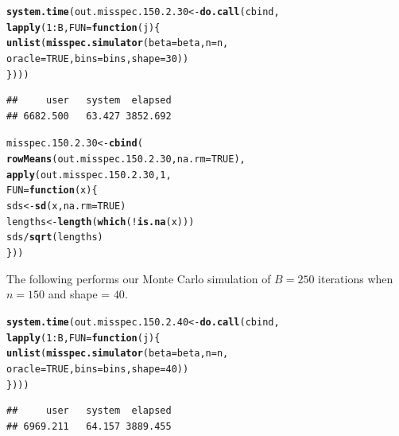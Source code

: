 \documentclass[11pt]{article}\usepackage[]{graphicx}\usepackage[]{color}
\makeatletter
\newcommand{\hlnum}[1]{\textcolor[rgb]{0.686,0.059,0.569}{#1}}%
\newcommand{\hlopt}[1]{\textcolor[rgb]{0,0,0}{#1}}%
\newcommand{\hlstd}[1]{\textcolor[rgb]{0.345,0.345,0.345}{#1}}%
\newcommand{\hlkwa}[1]{\textcolor[rgb]{0.161,0.373,0.58}{\textbf{#1}}}%
\newcommand{\hlkwb}[1]{\textcolor[rgb]{0.69,0.353,0.396}{#1}}%
\newcommand{\hlkwc}[1]{\textcolor[rgb]{0.333,0.667,0.333}{#1}}%
\newcommand{\hlkwd}[1]{\textcolor[rgb]{0.737,0.353,0.396}{\textbf{#1}}}%
\newenvironment{kframe}{%
 \def\at@end@of@kframe{}%
 \ifinner\ifhmode%
  \def\at@end@of@kframe{\end{minipage}}%
  \begin{minipage}{\columnwidth}%
 \fi\fi%
 \def\FrameCommand##1{\hskip\@totalleftmargin \hskip-\fboxsep
 \colorbox{shadecolor}{##1}\hskip-\fboxsep
     \hskip-\linewidth \hskip-\@totalleftmargin \hskip\columnwidth}%
 \MakeFramed {\advance\hsize-\width
   \@totalleftmargin\z@ \linewidth\hsize
   \@setminipage}}%
 {\par\unskip\endMakeFramed%
 \at@end@of@kframe}
\newenvironment{knitrout}{}{} %
\makeatother
\begin{document}
\begin{knitrout}
\color{fgcolor}\begin{kframe}
\begin{alltt}
\hlkwd{system.time}\hlstd{(out.misspec.150.2.30} \hlkwb{<-} \hlkwd{do.call}\hlstd{(cbind,}
  \hlkwd{lapply}\hlstd{(}\hlnum{1}\hlopt{:}\hlstd{B,} \hlkwc{FUN} \hlstd{=} \hlkwa{function}\hlstd{(}\hlkwc{j}\hlstd{)\{}
    \hlkwd{unlist}\hlstd{(}\hlkwd{misspec.simulator}\hlstd{(}\hlkwc{beta} \hlstd{= beta,} \hlkwc{n} \hlstd{= n,}
      \hlkwc{oracle} \hlstd{=} \hlnum{TRUE}\hlstd{,} \hlkwc{bins} \hlstd{= bins,} \hlkwc{shape} \hlstd{=} \hlnum{30}\hlstd{))}
\hlstd{\})))}
\end{alltt}
\begin{verbatim}
##     user   system  elapsed 
## 6682.500   63.427 3852.692
\end{verbatim}
\end{kframe}
\end{knitrout}

\begin{knitrout}
\color{fgcolor}\begin{kframe}
\begin{alltt}
\hlstd{misspec.150.2.30} \hlkwb{<-} \hlkwd{cbind}\hlstd{(}
  \hlkwd{rowMeans}\hlstd{(out.misspec.150.2.30,} \hlkwc{na.rm} \hlstd{=} \hlnum{TRUE}\hlstd{),}
  \hlkwd{apply}\hlstd{(out.misspec.150.2.30,} \hlnum{1}\hlstd{,}
  \hlkwc{FUN} \hlstd{=} \hlkwa{function}\hlstd{(}\hlkwc{x}\hlstd{)\{}
    \hlstd{sds} \hlkwb{<-} \hlkwd{sd}\hlstd{(x,} \hlkwc{na.rm} \hlstd{=} \hlnum{TRUE}\hlstd{)}
    \hlstd{lengths} \hlkwb{<-} \hlkwd{length}\hlstd{(}\hlkwd{which}\hlstd{(}\hlopt{!}\hlkwd{is.na}\hlstd{(x)))}
    \hlstd{sds} \hlopt{/} \hlkwd{sqrt}\hlstd{(lengths)}
  \hlstd{\}))}
\end{alltt}
\end{kframe}
\end{knitrout}

The following performs our Monte Carlo simulation of $B = 250$ iterations 
when $n = 150$ and shape = $40$.

\begin{knitrout}
\color{fgcolor}\begin{kframe}
\begin{alltt}
\hlkwd{system.time}\hlstd{(out.misspec.150.2.40} \hlkwb{<-} \hlkwd{do.call}\hlstd{(cbind,}
  \hlkwd{lapply}\hlstd{(}\hlnum{1}\hlopt{:}\hlstd{B,} \hlkwc{FUN} \hlstd{=} \hlkwa{function}\hlstd{(}\hlkwc{j}\hlstd{)\{}
    \hlkwd{unlist}\hlstd{(}\hlkwd{misspec.simulator}\hlstd{(}\hlkwc{beta} \hlstd{= beta,} \hlkwc{n} \hlstd{= n,}
      \hlkwc{oracle} \hlstd{=} \hlnum{TRUE}\hlstd{,} \hlkwc{bins} \hlstd{= bins,} \hlkwc{shape} \hlstd{=} \hlnum{40}\hlstd{))}
\hlstd{\})))}
\end{alltt}
\begin{verbatim}
##     user   system  elapsed 
## 6969.211   64.157 3889.455
\end{verbatim}
\end{kframe}
\end{knitrout}
\end{document}
